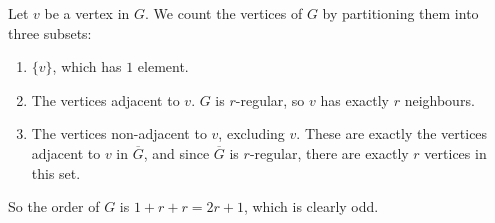 Let $v$ be a vertex in $G$. We count the vertices of $G$ by partitioning them into three subsets:
\begin{enumerate}
\item $\{v\}$, which has $1$ element.
\item The vertices adjacent to $v$. $G$ is $r$-regular, so $v$ has exactly $r$
neighbours.
\item The vertices non-adjacent to $v$, excluding $v$. These are exactly the
vertices adjacent to $v$ in $\overline{G}$, and since $\overline{G}$ is $r$-regular,
there are exactly $r$ vertices in this set.
\end{enumerate}
So the order of $G$ is $1+r+r=2r+1$, which is clearly odd.

